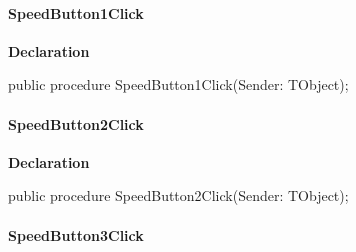 \documentclass{report}
\newif\ifpdf
\begin{document}
\paragraph*{SpeedButton1Click}\hspace*{\fill}

\label{prjwizard.TfrmProjectWizard-SpeedButton1Click}
\begin{list}{}{
\setlength{\itemindent}{0cm}
\setlength{\listparindent}{0cm}
\setlength{\leftmargin}{\evensidemargin}
\addtolength{\leftmargin}{\tmplength}
\settowidth{\labelsep}{X}
\addtolength{\leftmargin}{\labelsep}
\setlength{\labelwidth}{\tmplength}
}
\item[\textbf{Declaration}\hfill]
\ifpdf
\begin{flushleft}
\fi
\begin{ttfamily}
public procedure SpeedButton1Click(Sender: TObject);\end{ttfamily}

\ifpdf
\end{flushleft}
\fi

\end{list}
\paragraph*{SpeedButton2Click}\hspace*{\fill}

\label{prjwizard.TfrmProjectWizard-SpeedButton2Click}
\begin{list}{}{
\setlength{\itemindent}{0cm}
\setlength{\listparindent}{0cm}
\setlength{\leftmargin}{\evensidemargin}
\addtolength{\leftmargin}{\tmplength}
\settowidth{\labelsep}{X}
\addtolength{\leftmargin}{\labelsep}
\setlength{\labelwidth}{\tmplength}
}
\item[\textbf{Declaration}\hfill]
\ifpdf
\begin{flushleft}
\fi
\begin{ttfamily}
public procedure SpeedButton2Click(Sender: TObject);\end{ttfamily}

\ifpdf
\end{flushleft}
\fi

\end{list}
\paragraph*{SpeedButton3Click}\hspace*{\fill}
\end{document}
